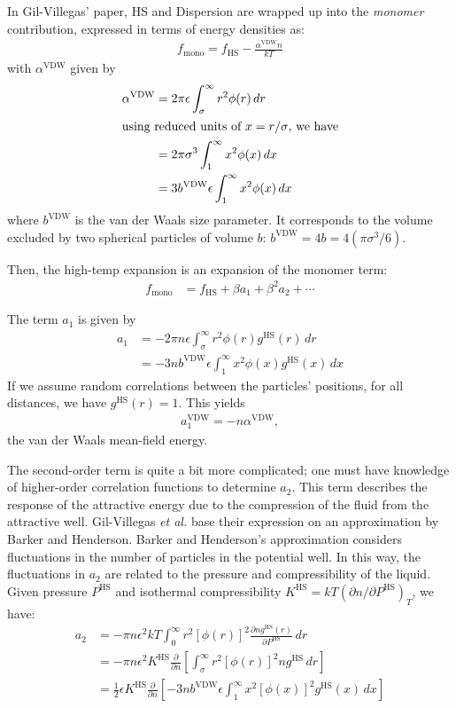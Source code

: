 \documentclass[letterpaper,twocolumn,amsmath,amssymb,prb]{revtex4-1}
\newcommand{\1}{\ensuremath{\textbf{r}_1}}
\newcommand{\2}{\ensuremath{\textbf{r}_2}}
\newcommand{\3}{\ensuremath{\textbf{r}_3}}
\newcommand{\4}{\ensuremath{\textbf{r}_4}}
\begin{document}
In Gil-Villegas' paper,\cite{gil-villegas97} HS and Dispersion are wrapped up into the
\textit{monomer} contribution, expressed in terms of energy densities
as:
\begin{align}
  f_\text{mono} = f_\text{HS} - \frac{\alpha^\text{VDW}n}{kT}
\end{align}
with $\alpha^\text{VDW}$ given by
\begin{align}
  \alpha^\text{VDW} &= 2\pi\epsilon\int_\sigma^\infty r^2\phi(r)\,dr \\
  \intertext{using reduced units of $x = r/\sigma$, we have}
  &= 2\pi\sigma^3\int_1^\infty x^2\phi(x)\,dx \\
  &= 3b^\text{VDW}\epsilon\int_1^\infty x^2\phi(x)\,dx
\end{align}
where $b^\text{VDW}$ is the van der Waals size parameter. It corresponds to the volume excluded by two spherical particles of volume $b$: $b^\text{VDW} = 4b = 4\left(\pi\sigma^3/6\right)$.

Then, the high-temp expansion is an expansion of the monomer term:
\begin{align}
  f_\text{mono} &= f_\text{HS} + \beta a_1 + \beta^2 a_2 + \cdots
\end{align}

The term $a_1$ is given by
\begin{align}
  a_1 &= -2\pi n \epsilon\int_\sigma^\infty r^2\phi(r)g^\text{HS}(r)\,dr \\
  &= -3 n  b^\text{VDW}\epsilon\int_1^\infty x^2\phi(x)g^\text{HS}(x)\,dx
\end{align}
If we assume random correlations between the particles' positions, for all distances, we have $g^\text{HS}(r) = 1$. This yields
\begin{align}
  a_1^\text{VDW} = - n \alpha^\text{VDW},
\end{align}
the van der Waals mean-field energy.

The second-order term is quite a bit more complicated; one must have knowledge of higher-order correlation functions to determine $a_2$. This term describes the response of the attractive energy due to the compression of the fluid from the attractive well. Gil-Villegas \emph{et al.} base their expression on an approximation by Barker and Henderson.\cite{Barker67} Barker and Henderson's approximation considers fluctuations in the number of particles in the potential well. In this way, the fluctuations in $a_2$ are related to the pressure and compressibility of the liquid. Given pressure $P^\text{HS}$ and isothermal compressibility $K^\text{HS} = kT\left(\partial n  /\partial P^\text{HS}\right)_T$, we have:
\begin{align}
  a_2 &= -\pi n \epsilon^2kT\int_0^\infty r^2\left[\phi(r)\right]^2\frac{\partial n  g^\text{HS}(r)}{\partial P^\text{HS}}\,dr \\
  &= -\pi n \epsilon^2K^\text{HS}\frac{\partial}{\partial n }\left[\int_\sigma^\infty r^2\left[\phi(r)\right]^2 n  g^\text{HS}\,dr\right] \\
  &= \frac{1}{2}\epsilon K^\text{HS}\frac{\partial}{\partial n }\left[-3 n  b^\text{VDW}\epsilon\int_1^\infty x^2\left[\phi(x)\right]^2 g^\text{HS}(x)\,dx \right]
\end{align}
\end{document}

